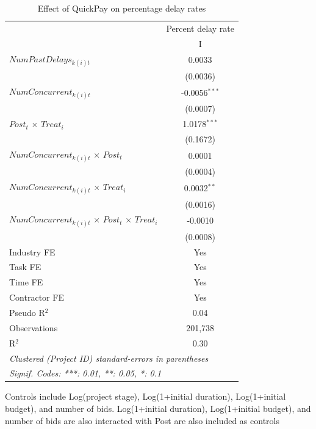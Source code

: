 \documentclass[
]{article}
\begin{document}
\begin{table}[htbp]
   \caption{Effect of QuickPay on percentage delay rates}
   \centering
   \small
   \begin{tabular}{lc}
      \toprule
                                                                     & Percent delay rate\\  
                                                                     & I\\  
      \midrule 
      $NumPastDelays_{k(i)t}$                                        & 0.0033\\   
                                                                     & (0.0036)\\   
      $NumConcurrent_{k(i)t}$                                        & -0.0056$^{***}$\\   
                                                                     & (0.0007)\\   
      $Post_t$ $\times$ $Treat_i$                                    & 1.0178$^{***}$\\   
                                                                     & (0.1672)\\   
      $NumConcurrent_{k(i)t}$ $\times$ $Post_t$                      & 0.0001\\   
                                                                     & (0.0004)\\   
      $NumConcurrent_{k(i)t}$ $\times$ $Treat_i$                     & 0.0032$^{**}$\\   
                                                                     & (0.0016)\\   
      $NumConcurrent_{k(i)t}$ $\times$ $Post_t$ $\times$ $Treat_i$   & -0.0010\\   
                                                                     & (0.0008)\\   
      \midrule 
      Industry FE                                                    & Yes\\  
      Task FE                                                        & Yes\\  
      Time FE                                                        & Yes\\  
      Contractor FE                                                  & Yes\\  
      Pseudo R$^2$                                                   & 0.04\\  
      Observations                                                   & 201,738\\  
      R$^2$                                                          & 0.30\\  
      \midrule
      \multicolumn{2}{l}{\emph{Clustered (Project ID) standard-errors in parentheses}}\\
      \multicolumn{2}{l}{\emph{Signif. Codes: ***: 0.01, **: 0.05, *: 0.1}}\\
   \end{tabular}
   
   \par \raggedright 
   Controls include Log(project stage), Log(1+initial duration), Log(1+initial budget), and number of bids. Log(1+initial duration), Log(1+initial budget), and number of bids are also interacted with Post are also included as controls
\end{table}
\end{document}
